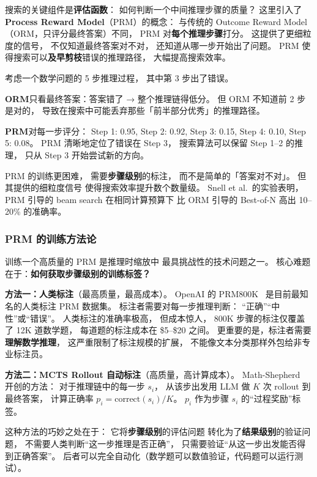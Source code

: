 搜索的关键组件是\textbf{评估函数}：
如何判断一个中间推理步骤的质量？
这里引入了 \textbf{Process Reward Model}（PRM）的概念：
与传统的 Outcome Reward Model（ORM，只评分最终答案）不同，
PRM 对\textbf{每个推理步骤}打分。
这提供了更细粒度的信号，
不仅知道最终答案对不对，
还知道从哪一步开始出了问题。
PRM 使得搜索可以\textbf{及早剪枝}错误的推理路径，
大幅提高搜索效率。

\begin{whybox}
考虑一个数学问题的 5 步推理过程，
其中第 3 步出了错误。

\textbf{ORM}只看最终答案：答案错了 → 整个推理链得低分。
但 ORM 不知道前 2 步是对的，
导致在搜索中可能丢弃那些「前半部分优秀」的推理路径。

\textbf{PRM}对每一步评分：
Step 1: 0.95, Step 2: 0.92, Step 3: 0.15, Step 4: 0.10, Step 5: 0.08。
PRM 清晰地定位了错误在 Step 3，
搜索算法可以保留 Step 1--2 的推理，
只从 Step 3 开始尝试新的方向。

PRM 的训练更困难，
需要\textbf{步骤级别}的标注，
而不是简单的「答案对不对」。
但其提供的细粒度信号
使得搜索效率提升数个数量级。
Snell et al.\ 的实验表明，
PRM 引导的 beam search 在相同计算预算下
比 ORM 引导的 Best-of-N 高出 10--20\% 的准确率。
\end{whybox}

\subsubsection{PRM 的训练方法论}

训练一个高质量的 PRM 是推理时缩放中
最具挑战性的技术问题之一。
核心难题在于：\textbf{如何获取步骤级别的训练标签？}

\textbf{方法一：人类标注}（最高质量，最高成本）。
OpenAI 的 PRM800K~\cite{lightman2024lets}
是目前最知名的人类标注 PRM 数据集。
标注者需要对每一步推理判断：
“正确”“中性”或“错误”。
人类标注的准确率极高，
但成本惊人，
800K 步骤的标注仅覆盖了 12K 道数学题，
每道题的标注成本在 \$5--\$20 之间。
更重要的是，标注者需要\textbf{理解数学推理}，
这严重限制了标注规模的扩展，
不能像文本分类那样外包给非专业标注员。

\textbf{方法二：MCTS Rollout 自动标注}（高质量，高计算成本）。
Math-Shepherd~\cite{wang2024mathshepherd} 开创的方法：
对于推理链中的每一步 $s_i$，
从该步出发用 LLM 做 $K$ 次 rollout 到最终答案，
计算正确率 $p_i = \text{correct}(s_i) / K$。
$p_i$ 作为步骤 $s_i$ 的“过程奖励”标签。

这种方法的巧妙之处在于：
它将\textbf{步骤级别}的评估问题
转化为了\textbf{结果级别}的验证问题，
不需要人类判断“这一步推理是否正确”，
只需要验证“从这一步出发能否得到正确答案”。
后者可以完全自动化（数学题可以数值验证，代码题可以运行测试）。

